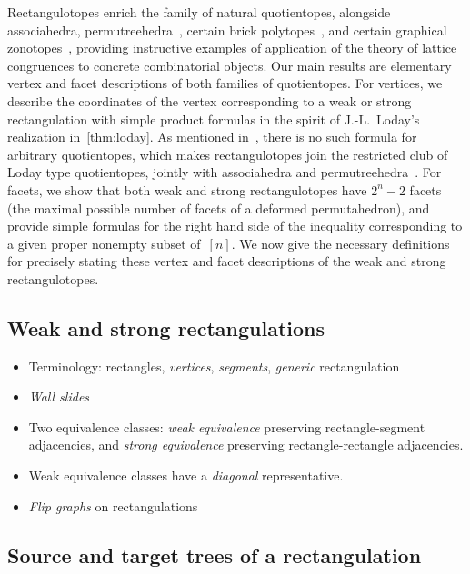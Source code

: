 \documentclass{amsart}
\theoremstyle{definition}
\newcommand{\darkblue}{\color{darkblue}} %
\newcommand{\defn}[1]{\textsl{\darkblue #1}} %
\begin{document}
Rectangulotopes enrich the family of natural quotientopes, alongside associahedra, permutreehedra~\cite{MR3856522}, certain brick polytopes~\cite{PilaudSantos-brickPolytopes, PilaudStump-brickPolytopes, Pilaud-brickAlgebra}, and certain graphical zonotopes~\cite{Pilaud-brickAlgebra, Pilaud-acyclicReorientationLattices}, providing instructive examples of application of the theory of lattice congruences to concrete combinatorial objects.
Our main results are elementary vertex and facet descriptions of both families of quotientopes.
For vertices, we describe the coordinates of the vertex corresponding to a weak or strong rectangulation with simple product formulas in the spirit of J.-L.~Loday's realization in~\cref{thm:loday}.
As mentioned in~\cite{PilaudSantosZiegler}, there is no such formula for arbitrary quotientopes, which makes rectangulotopes join the restricted club of Loday type quotientopes, jointly with associahedra and permutreehedra~\cite{MR3856522}.
For facets, we show that both weak and strong rectangulotopes have $2^n-2$ facets (the maximal possible number of facets of a deformed permutahedron), and provide simple formulas for the right hand side of the inequality corresponding to a given proper nonempty subset of~$[n]$.
We now give the necessary definitions for precisely stating these vertex and facet descriptions of the weak and strong rectangulotopes.

\subsection{Weak and strong rectangulations}

\begin{itemize}
\item Terminology: rectangles, \defn{vertices}, \defn{segments}, \defn{generic} rectangulation
\item \defn{Wall slides}
\item Two equivalence classes: \defn{weak equivalence} preserving rectangle-segment adjacencies, and \defn{strong equivalence} preserving rectangle-rectangle adjacencies.
\item Weak equivalence classes have a \defn{diagonal} representative.
\item \defn{Flip graphs} on rectangulations
\end{itemize}


\subsection{Source and target trees of a rectangulation}
\label{subsec:sourceTargetTrees}
\end{document}

